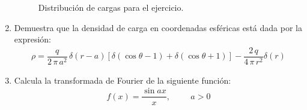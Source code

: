 \documentclass[12pt]{article}
\numberwithin{equation}{section}
\begin{document}
\begin{enumerate}
\begin{figure}[H]
    \caption{Distribución de cargas para el ejercicio.}
    \label{fig:figura_multipolo_01}
\end{figure}
\item Demuestra que la densidad de carga en coordenadas esféricas está dada por la expresión:
\begin{align*}
\rho = \dfrac{q}{2 \, \pi \, a^{2}} \, \delta(r -a) [\delta (\cos \theta - 1) + \delta (\cos \theta + 1)] - \dfrac{2 \, q}{4 \, \pi \, r^{2}} \delta(r)
\end{align*}
\item Calcula la transformada de Fourier de la siguiente función:
\begin{align*}
f (x) = \dfrac{\sin a x}{x}, \hspace{1cm} a > 0
\end{align*}
\end{enumerate}
\end{document}
